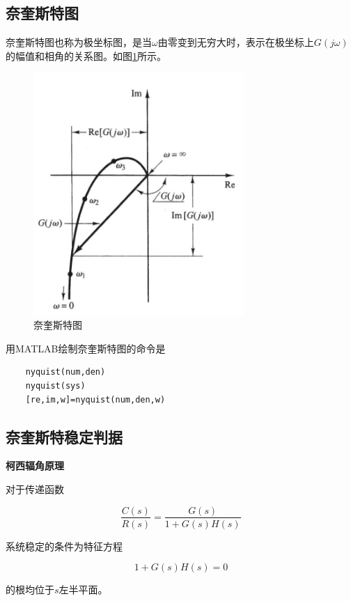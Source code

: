 \subsection{奈奎斯特图}

奈奎斯特图也称为极坐标图，是当$\omega$由零变到无穷大时，表示在极坐标上$G(j\omega)$的幅值和相角的关系图。如图\ref{23}所示。

\begin{figure}[!ht]
    \centering
    \includegraphics[width=8cm]{figures/23.png}
    \caption{奈奎斯特图}
    \label{23}
\end{figure}

用MATLAB绘制奈奎斯特图的命令是

\begin{lstlisting}
    nyquist(num,den)
    nyquist(sys)
    [re,im,w]=nyquist(num,den,w)
\end{lstlisting}

\subsection{奈奎斯特稳定判据}

\textbf{柯西辐角原理}

对于传递函数

\begin{equation*}
    \frac{C(s)}{R(s)}=\frac{G(s)}{1+G(s)H(s)}
\end{equation*}

系统稳定的条件为特征方程

\begin{equation*}
    1+G(s)H(s)=0
\end{equation*}

的根均位于$s$左半平面。

